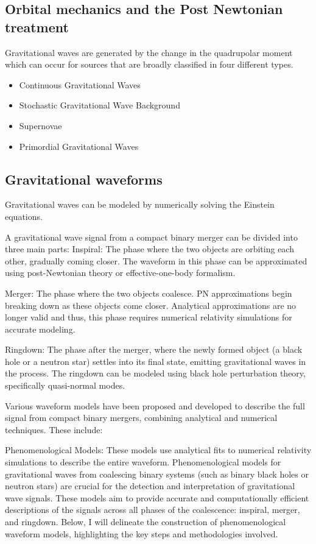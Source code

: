 \subsection{Orbital mechanics and the Post Newtonian treatment}

Gravitational waves are generated by the change in the quadrupolar moment which can occur for sources that are broadly classified in four different types. \\

\begin{itemize}
\item Continuous Gravitational Waves
\item Stochastic Gravitational Wave Background
\item Supernovae
\item Primordial Gravitational Waves
\end{itemize}


\subsection{Gravitational waveforms}

Gravitational waves can be modeled by numerically solving the Einstein equations. 

A gravitational wave signal from a compact binary merger can be divided into three main parts:
Inspiral: The phase where the two objects are orbiting each other, gradually coming closer. The waveform in this phase can be approximated using post-Newtonian theory or effective-one-body formalism.

Merger: The phase where the two objects coalesce. PN approximations begin breaking down as these objects come closer. Analytical approximations are no longer valid and thus, this phase requires numerical relativity simulations for accurate modeling.

Ringdown: The phase after the merger, where the newly formed object (a black hole or a neutron star) settles into its final state, emitting gravitational waves in the process. The ringdown can be modeled using black hole perturbation theory, specifically quasi-normal modes.

Various waveform models have been proposed and developed to describe the full signal from compact binary mergers, combining analytical and numerical techniques. These include:

Phenomenological Models: These models use analytical fits to numerical relativity simulations to describe the entire waveform. Phenomenological models for gravitational waves from coalescing binary systems (such as binary black holes or neutron stars) are crucial for the detection and interpretation of gravitational wave signals. These models aim to provide accurate and computationally efficient descriptions of the signals across all phases of the coalescence: inspiral, merger, and ringdown. Below, I will delineate the construction of phenomenological waveform models, highlighting the key steps and methodologies involved.

